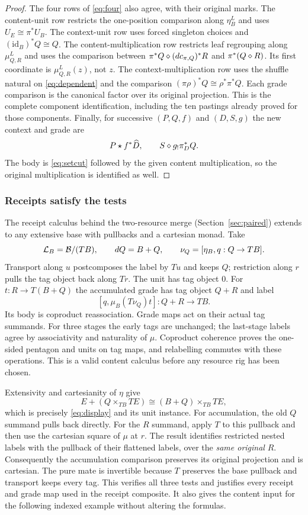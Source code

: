 \documentclass[11pt]{article}
\numberwithin{equation}{section}
\theoremstyle{definition}\newtheorem{definition}[theorem]{Definition}
\newcommand{\B}{\mathcal B}\newcommand{\J}{\mathcal J}
\newcommand{\id}{\mathrm{id}}\newcommand{\op}{\mathrm{op}}\newcommand{\dom}{\mathrm{dom}}\newcommand{\cod}{\mathrm{cod}}
\begin{document}
\begin{proof}
The four rows of \eqref{eq:four} also agree, with their original marks.
The content-unit row restricts the one-position comparison along
$\eta^L_B$ and uses $U_E\cong\pi^*U_B$. The context-unit row uses
forced singleton choices and $(\id_B)^*Q\cong Q$. The content-multiplication
row restricts leaf regrouping along $\mu^L_{Q,R}$ and uses the comparison
between $\pi^*Q\mathbin{\diamond}(dc_{\pi,Q})^*R$ and $\pi^*(Q\mathbin{\diamond} R)$. Its first
coordinate is $\mu^L_{Q,R}(z)$, not $z$. The context-multiplication row
uses the shuffle natural on \eqref{eq:dependent} and the comparison
$(\pi\rho)^*Q\cong\rho^*\pi^*Q$. Each grade comparison is the canonical
factor over its original projection. This is the complete component
identification, including the ten pastings already proved for those
components. Finally, for successive $(P,Q,f)$ and $(D,S,g)$ the new
context and grade are
\[
                 P\mathbin{\star} f^*\widehat D,
                 \qquad S\mathbin{\diamond} g_!\pi_D^*Q.
\]
The body is \eqref{eq:setcut} followed by the given content multiplication,
so the original multiplication is identified as well.
\end{proof}

\subsubsection{Receipts satisfy the tests}\label{sec:receipts}
The receipt calculus behind the two-resource merge (Section~\ref{sec:paired})
extends to any extensive base with pullbacks and a cartesian monad. Take
\[
 \Lcat_B=\B/(TB),\qquad dQ=B+Q,\qquad
 \nu_Q=[\eta_B,q:Q\to TB].
\]
Transport along $u$ postcomposes the label by $Tu$ and keeps $Q$;
restriction along $r$ pulls the tag object back along $Tr$.
The unit has tag object $0$. For $t:R\to T(B+Q)$ the accumulated grade
has tag object $Q+R$ and label
\begin{equation}\label{eq:receipts}
                      [q,\mu_B(T\nu_Q)t]:Q+R\longrightarrow TB.
\end{equation}
Its body is coproduct reassociation. Grade maps act on their actual tag
summands. For three stages the early tags are unchanged; the last-stage
labels agree by associativity and naturality of $\mu$. Coproduct
coherence proves the one-sided pentagon and units on tag maps, and
relabelling commutes with these operations. This is a valid content
calculus before any resource rig has been chosen.

Extensivity and cartesianity of $\eta$ give
\[
 E+(Q\times_{TB}TE)\cong(B+Q)\times_{TB}TE,
\]
which is precisely \eqref{eq:display} and its unit instance.
For accumulation, the old $Q$ summand pulls back directly. For the $R$
summand, apply $T$ to this pullback and then use the cartesian square of
$\mu$ at $r$. The result identifies restricted nested labels with the
pullback of their flattened labels, over the \emph{same original} $R$.
Consequently the accumulation comparison preserves its original projection
and is cartesian. The pure mate is invertible because $T$ preserves the
base pullback and transport keeps every tag. This verifies all three
tests and justifies every receipt and grade map used in the receipt
composite. It also gives the content input for the following indexed
example without altering the formulas.
\end{document}
